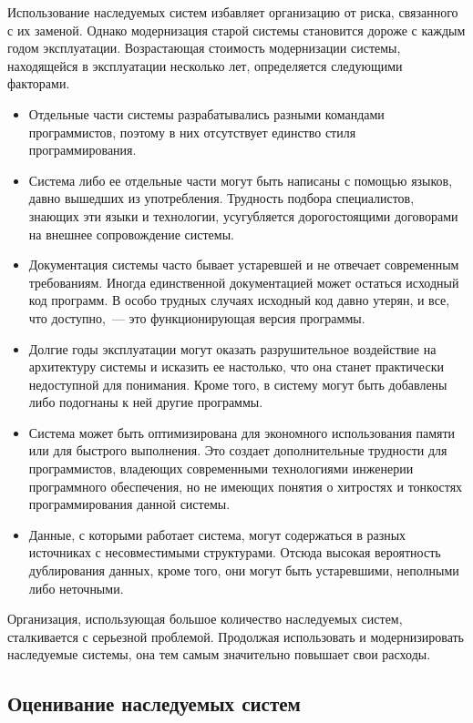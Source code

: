 \documentclass{../../text-style}
\begin{document}
Использование наследуемых систем избавляет организацию от риска, связанного с их заменой. Однако модернизация старой системы становится дороже с каждым годом эксплуатации. Возрастающая стоимость модернизации системы, находящейся в эксплуатации несколько лет, определяется следующими факторами.

\begin{itemize}
    \item Отдельные части системы разрабатывались разными командами программистов, поэтому в них отсутствует единство стиля программирования.
    \item Система либо ее отдельные части могут быть написаны с помощью языков, давно вышедших из употребления. Трудность подбора специалистов, знающих эти языки и технологии, усугубляется дорогостоящими договорами на внешнее сопровождение системы.
    \item Документация системы часто бывает устаревшей и не отвечает современным требованиям. Иногда единственной документацией может остаться исходный код программ. В особо трудных случаях исходный код давно утерян, и все, что доступно,~--- это функционирующая версия программы.
    \item Долгие годы эксплуатации могут оказать разрушительное воздействие на архитектуру системы и исказить ее настолько, что она станет практически недоступной для понимания. Кроме того, в систему могут быть добавлены либо подогнаны к ней другие программы.
    \item Система может быть оптимизирована для экономного использования памяти или для быстрого выполнения. Это создает дополнительные трудности для программистов, владеющих современными технологиями инженерии программного обеспечения, но не имеющих понятия о хитростях и тонкостях программирования данной системы.
    \item Данные, с которыми работает система, могут содержаться в разных источниках с несовместимыми структурами. Отсюда высокая вероятность дублирования данных, кроме того, они могут быть устаревшими, неполными либо неточными.
\end{itemize}

Организация, использующая большое количество наследуемых систем, сталкивается с серьезной проблемой. Продолжая использовать и модернизировать наследуемые системы, она тем самым значительно повышает свои расходы.

\subsection{Оценивание наследуемых систем}
\end{document}
